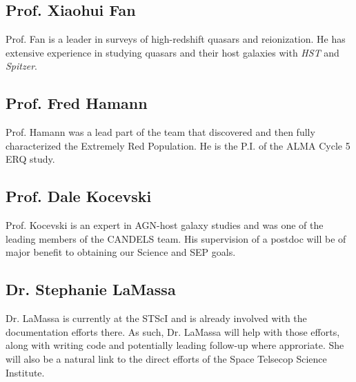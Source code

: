 \documentclass[11pt,a4paper]{article}
\begin{document}
\iffalse
\subsection*{Prof. Beth Biller}
Prof. Biller is an expert in infrared coronagraphic observations. 
While we do not intend to use the MIRI coronagraphs in this proposal, 
longer term observations would potentially involve observing the ERQs
with the Lyot or 4QPM if this became appropriate and technically feasible. 
\fi

\iffalse
\subsection*{Prof. Niel Brandt}
\fi


\subsection*{Prof. Xiaohui Fan}
Prof. Fan is a leader in surveys of high-redshift quasars and
reionization. He has extensive experience in studying quasars and
their host galaxies with {\it HST} and {\it Spitzer}.


\subsection*{Prof. Fred Hamann}
Prof. Hamann was a lead part of the team that discovered and then
fully characterized the Extremely Red Population. He is the P.I. of
the ALMA Cycle 5 ERQ study.


\subsection*{Prof. Dale Kocevski}
Prof. Kocevski is an expert in AGN-host galaxy studies and was 
one of the leading members of the CANDELS team. His supervision 
of a postdoc will be of major benefit to obtaining our Science and 
SEP goals. 


\iffalse
\subsection*{Prof. Linhua Jiang}
\fi


\subsection*{Dr. Stephanie LaMassa}
Dr. LaMassa is currently at the STScI and is already involved with the
documentation efforts there. As such, Dr. LaMassa will help with those
efforts, along with writing code and potentially leading follow-up
where approriate. She will also be a natural link to the direct
efforts of the Space Telsecop Science Institute.
\end{document}
